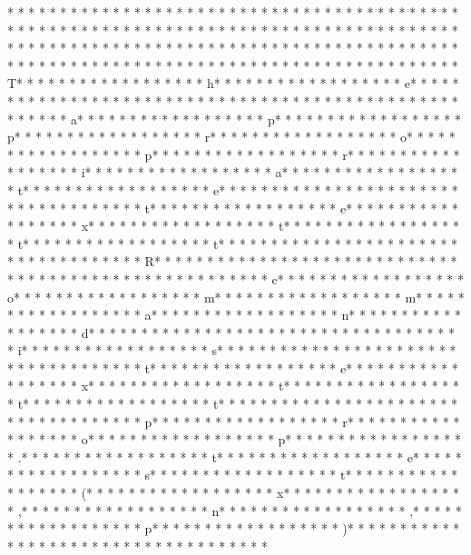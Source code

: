 * * *  * * *  * * *  *  * * *  *  * * *  * * *  * * *  *  * * *  *  * * *  * * *  * * *  *  * * *  *  * * *  *  * * *  * * *  * * *  *  * * *  *  * * *  *  * * *  * * *  * * *  *  * * *  *  * * *  *  * * *  * * *  * * *  *  * * *  *  * * *  *  * * *  * * *  * * *  *  * * *  *  * * *  *  * * *  * * *  * * *  *  * * *  *  * * *  *  * * *  * * *  * * *  *  * * *  *  * * *  *  * * *  * * *  * * *  *  * * *  *  * * *  * T* * *  * * *  * * *  *  * * *  *  * * *  * h* * *  * * *  * * *  *  * * *  *  * * *  * e* * *  * * *  * * *  *  * * *  *  * * *  *  * * *  * * *  * * *  *  * * *  *  * * *  *  * * *  * * *  * * *  *  * * *  *  * * *  * a* * *  * * *  * * *  *  * * *  *  * * *  * p* * *  * * *  * * *  *  * * *  *  * * *  * p* * *  * * *  * * *  *  * * *  *  * * *  * r* * *  * * *  * * *  *  * * *  *  * * *  * o* * *  * * *  * * *  *  * * *  *  * * *  * p* * *  * * *  * * *  *  * * *  *  * * *  * r* * *  * * *  * * *  *  * * *  *  * * *  * i* * *  * * *  * * *  *  * * *  *  * * *  * a* * *  * * *  * * *  *  * * *  *  * * *  * t* * *  * * *  * * *  *  * * *  *  * * *  * e* * *  * * *  * * *  *  * * *  *  * * *  *  * * *  * * *  * * *  *  * * *  *  * * *  * t* * *  * * *  * * *  *  * * *  *  * * *  * e* * *  * * *  * * *  *  * * *  *  * * *  * x* * *  * * *  * * *  *  * * *  *  * * *  * t* * *  * * *  * * *  *  * * *  *  * * *  * t* * *  * * *  * * *  *  * * *  *  * * *  * t* * *  * * *  * * *  *  * * *  *  * * *  * {* * *  * * *  * * *  *  * * *  *  * * *  * R* * *  * * *  * * *  *  * * *  *  * * *  * }* * *  * * *  * * *  *  * * *  *  * * *  *  * * *  * * *  * * *  *  * * *  *  * * *  * c* * *  * * *  * * *  *  * * *  *  * * *  * o* * *  * * *  * * *  *  * * *  *  * * *  * m* * *  * * *  * * *  *  * * *  *  * * *  * m* * *  * * *  * * *  *  * * *  *  * * *  * a* * *  * * *  * * *  *  * * *  *  * * *  * n* * *  * * *  * * *  *  * * *  *  * * *  * d* * *  * * *  * * *  *  * * *  *  * * *  *  * * *  * * *  * * *  *  * * *  *  * * *  * i* * *  * * *  * * *  *  * * *  *  * * *  * s* * *  * * *  * * *  *  * * *  *  * * *  *  * * *  * * *  * * *  *  * * *  *  * * *  * t* * *  * * *  * * *  *  * * *  *  * * *  * e* * *  * * *  * * *  *  * * *  *  * * *  * x* * *  * * *  * * *  *  * * *  *  * * *  * t* * *  * * *  * * *  *  * * *  *  * * *  * t* * *  * * *  * * *  *  * * *  *  * * *  * t* * *  * * *  * * *  *  * * *  *  * * *  * {* * *  * * *  * * *  *  * * *  *  * * *  * p* * *  * * *  * * *  *  * * *  *  * * *  * r* * *  * * *  * * *  *  * * *  *  * * *  * o* * *  * * *  * * *  *  * * *  *  * * *  * p* * *  * * *  * * *  *  * * *  *  * * *  * .* * *  * * *  * * *  *  * * *  *  * * *  * t* * *  * * *  * * *  *  * * *  *  * * *  * e* * *  * * *  * * *  *  * * *  *  * * *  * s* * *  * * *  * * *  *  * * *  *  * * *  * t* * *  * * *  * * *  *  * * *  *  * * *  * (* * *  * * *  * * *  *  * * *  *  * * *  * x* * *  * * *  * * *  *  * * *  *  * * *  * ,* * *  * * *  * * *  *  * * *  *  * * *  * n* * *  * * *  * * *  *  * * *  *  * * *  * ,* * *  * * *  * * *  *  * * *  *  * * *  * p* * *  * * *  * * *  *  * * *  *  * * *  * )* * *  * * *  * * *  *  * * *  *  * * *  * }* * *  * * *  * * *  *  * * *  *  * * *  * 
